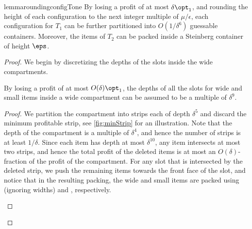 \begin{restatable}{lemma}{roundingconfigTone}
\label{lem:roundingconfigTone}
    By losing a profit of at most $\delta \opt_1$, and rounding the height of each configuration to the next integer multiple of $\mu/\epsilon$, each configuration for $T_1$ can be further partitioned into $O(1/\delta^6)$ guessable containers. Moreover, the items of $T_2$ can be packed inside a Steinberg container of height $\eps$.
\end{restatable}
\begin{proof}
We begin by discretizing the depths of the slots inside the wide compartments.

\begin{claim}
\label{lem:slotsandregions}
     By losing a profit of at most $O(\delta)\opt_1$, the depths of all the slots for wide and small items inside a wide compartment can be assumed to be a multiple of $\delta^9$.
\end{claim}
\begin{proof}
 We partition the compartment into strips each of depth $\delta^5$ and discard the minimum profitable strip, see \cref{fig:minStrip} for an illustration. Note that the depth of the compartment is a multiple of $\delta^4$, and hence the number of strips is at least $1/\delta$. Since each item has depth at most $\delta^{10}$, any item intersects at most two strips, and hence the total profit of the deleted items is at most an $O(\delta)$-fraction of the profit of the compartment. For any slot that is intersected by the deleted strip, we push the remaining items towards the front face of the slot, and notice that
 in the resulting packing, the wide and small items are packed using \NFDH (ignoring widths) and \tNFDH, respectively.

 \begin{figure}
    \centering
    
                    

\end{figure}
\end{proof}
\end{proof}

